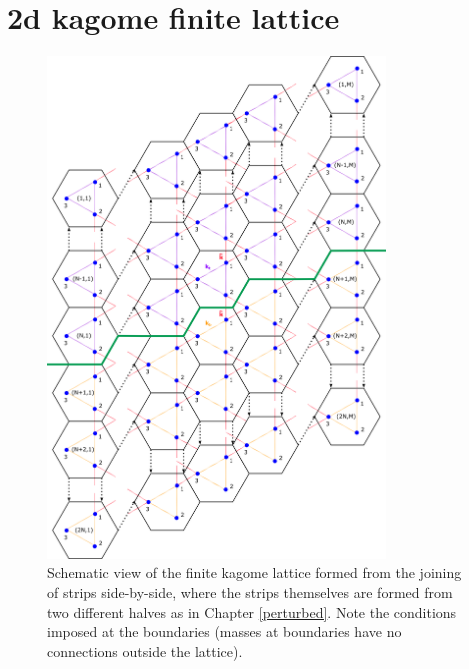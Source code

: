 \section{2d kagome finite lattice}
\begin{figure}[!h]
\centering
\includegraphics[width=0.8\textwidth]{imgs/kagomefinitemodel.png}
\caption{\label{fig:kagomeM} Schematic view of the finite kagome lattice formed
  from the joining of strips side-by-side, where the strips themselves are
  formed from two different halves as in Chapter \ref{perturbed}. Note the
  conditions imposed at the boundaries (masses at boundaries have no
  connections outside the lattice).}
\end{figure}


